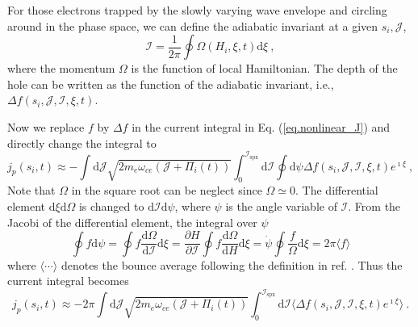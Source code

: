 For those electrons trapped by the slowly varying wave envelope and circling around in the phase space, we can define the adiabatic invariant at a given $s_i,\mathcal{J}$,
\begin{equation}\label{eq.def_I}
    \mathcal{I} = \frac{1}{2\pi} \oint \Omega(H_i,\xi,t) \mathrm{d} \xi~,
\end{equation}
where the momentum $\Omega$ is the function of local Hamiltonian.
The depth of the hole can be written as the function of the adiabatic invariant, i.e., $\Delta f(s_i,\mathcal{J},\mathcal{I},\xi,t)$.

Now we replace $f$ by $\Delta f$ in the current integral in Eq. (\ref{eq.nonlinear_J}) and directly change the integral to 
\begin{equation}
    j_p(s_i,t) \approx - \int\mathrm{d} \mathcal{J} \sqrt{2 m_e \omega_{ce} (\mathcal{J} + \Pi_i(t))} \int_0^{\mathcal{I}_{\mathrm{s p x}}}  \mathrm{d}\mathcal{I}  \oint \mathrm{d}\psi  \Delta f(s_i,\mathcal{J},\mathcal{I},\xi,t)e^{\imath \xi}  ~,
\end{equation}
Note that $\Omega$ in the square root can be neglect since $\Omega \simeq 0$.
The differential element $\mathrm{d}\xi\mathrm{d}\Omega$ is changed to $\mathrm{d}\mathcal{I}\mathrm{d}\psi$, where $\psi$ is the angle variable of $\mathcal{I}$.
From the Jacobi of the differential element, the integral over $\psi$ 
\begin{equation}
      \oint f \mathrm{d}\psi = \oint f \frac{\mathrm{d}\Omega}{\mathrm{d}\mathcal{I}}\mathrm{d}\xi = \frac{\partial H}{\partial \mathcal{I}} \oint f \frac{\mathrm{d}\Omega}{\mathrm{d} H}\mathrm{d}\xi = \dot{\psi}\oint \frac{f}{\Omega} \mathrm{d}\xi = 2 \pi \langle f \rangle
\end{equation}
where $\langle\cdots\rangle$ denotes the bounce average following the definition in ref. \cite{berk1999}.
Thus the current integral becomes
\begin{equation}\label{eq.adiabatic_current}
    j_p(s_i,t) \approx -  {2\pi} \int\mathrm{d} \mathcal{J}  \sqrt{2m_e\omega_{ce} (\mathcal{J} + \Pi_i(t))} \int_0^{\mathcal{I}_{\mathrm{s p x}}}\mathrm{d}\mathcal{I}  \langle \Delta f(s_i,\mathcal{J},\mathcal{I},\xi,t)e^{\imath \xi} \rangle  ~.
\end{equation}

